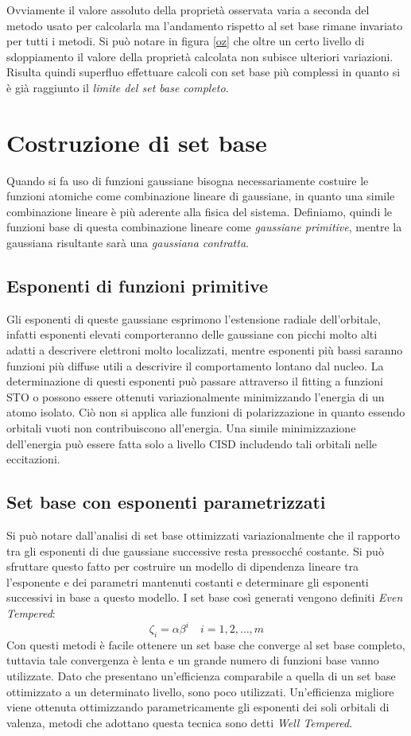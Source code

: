 \documentclass[oneside]{amsbook}
\numberwithin{section}{chapter}
\numberwithin{equation}{section}
\numberwithin{figure}{section}
\begin{document}
Ovviamente il valore assoluto della proprietà osservata varia a seconda del metodo usato per calcolarla ma l'andamento rispetto al set base rimane invariato per tutti i metodi. Si può notare in figura \ref{oz} che oltre un certo livello di sdoppiamento il valore della proprietà calcolata non subisce ulteriori variazioni. Risulta quindi superfluo effettuare calcoli con set base più complessi in quanto si è già raggiunto il \emph{limite del set base completo}.

\section{Costruzione di set base}
Quando si fa uso di funzioni gaussiane bisogna necessariamente costuire le funzioni atomiche come combinazione lineare di gaussiane, in quanto una simile combinazione lineare è più aderente alla fisica del sistema. Definiamo, quindi le funzioni base di questa combinazione lineare come \emph{gaussiane primitive}, mentre la gaussiana risultante sarà una \emph{gaussiana contratta}.

\subsection{Esponenti di funzioni primitive}
Gli esponenti di queste gaussiane esprimono l'estensione radiale dell'orbitale, infatti esponenti elevati comporteranno delle gaussiane con picchi molto alti adatti a descrivere elettroni molto localizzati, mentre esponenti più bassi saranno funzioni più diffuse utili a descrivire il comportamento lontano dal nucleo.
La determinazione di questi esponenti può passare attraverso il fitting a funzioni STO o possono essere ottenuti variazionalmente minimizzando l'energia di un atomo isolato.
Ciò non si applica alle funzioni di polarizzazione  in quanto essendo orbitali vuoti non contribuiscono all'energia. Una simile minimizzazione dell'energia può essere fatta solo a livello CISD includendo tali orbitali nelle eccitazioni.

\subsection{Set base con esponenti parametrizzati}
Si può notare dall'analisi di set base ottimizzati variazionalmente che il rapporto tra gli esponenti di due gaussiane successive resta pressocché costante.
Si può sfruttare questo fatto per costruire un modello di dipendenza lineare tra l'esponente e dei parametri mantenuti costanti e determinare gli esponenti successivi in base a questo modello. I set base così generati vengono definiti \emph{Even Tempered}:
\begin{equation}
\zeta_i=\alpha\beta^i \quad i=1,2,\ldots,m
\end{equation}
Con questi metodi è facile ottenere un set base che converge al set base completo, tuttavia tale convergenza è lenta e un grande numero di funzioni base vanno utilizzate. Dato che presentano un'efficienza comparabile a quella di un set base ottimizzato a un determinato livello, sono poco utilizzati.
Un'efficienza migliore viene ottenuta ottimizzando parametricamente gli esponenti dei soli orbitali di valenza, metodi che adottano questa tecnica sono detti \emph{Well Tempered}.
\end{document}
